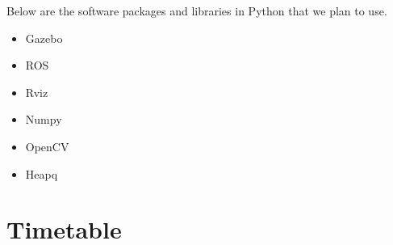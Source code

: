 \documentclass[12pt]{extarticle}
\begin{document}
Below are the software packages and libraries in Python that we plan to use.
\begin{itemize}
	\item Gazebo
	\item ROS
	\item Rviz
	\item Numpy
	\item OpenCV
	\item Heapq
\end{itemize}

\section{Timetable}
\end{document}

